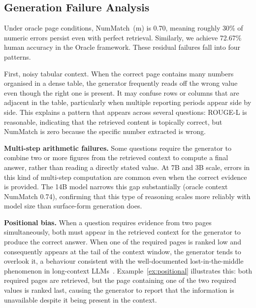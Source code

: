 \documentclass[12pt,twoside,maitrise]{dms}
\theoremstyle{definition}
\numberwithin{equation}{section}
\numberwithin{table}{chapter}
\numberwithin{figure}{chapter}
\begin{document}
\subsection{Generation Failure Analysis}
\label{sec:gen_failure}

Under oracle page conditions, NumMatch~(m) is 0.70, meaning roughly 30\% of numeric
errors persist even with perfect retrieval. Similarly, we achieve 72.67\% human accuracy in the Oracle framework. These residual failures fall into four
patterns.

First, noisy tabular context. When the correct page contains many numbers organised in a dense table, the generator
frequently reads off the wrong value even though the right one is present. It may
confuse rows or columns that are adjacent in the table, particularly when multiple
reporting periods appear side by side. This explains a pattern that appears across
several questions: ROUGE-L is reasonable, indicating that the retrieved content is
topically correct, but NumMatch is zero because the specific number extracted is wrong.

\textbf{Multi-step arithmetic failures.}
Some questions require the generator to combine two or more figures from the retrieved
context to compute a final answer, rather than reading a directly stated value. At 7B
and 3B scale, errors in this kind of multi-step computation are common even when the
correct evidence is provided. The 14B model narrows this gap substantially
(oracle context NumMatch 0.74), confirming that this type of reasoning scales more
reliably with model size than surface-form generation does.

\textbf{Positional bias.}
When a question requires evidence from two pages simultaneously, both must appear in the
retrieved context for the generator to produce the correct answer. When one of the
required pages is ranked low and consequently appears at the tail of the context window,
the generator tends to overlook it, a behaviour consistent with the well-documented
lost-in-the-middle phenomenon in long-context LLMs~\citep{liu2024lost}.
Example~\ref{ex:positional} illustrates this: both required pages are retrieved, but the
page containing one of the two required values is ranked last, causing the generator to
report that the information is unavailable despite it being present in the context.
\end{document}
